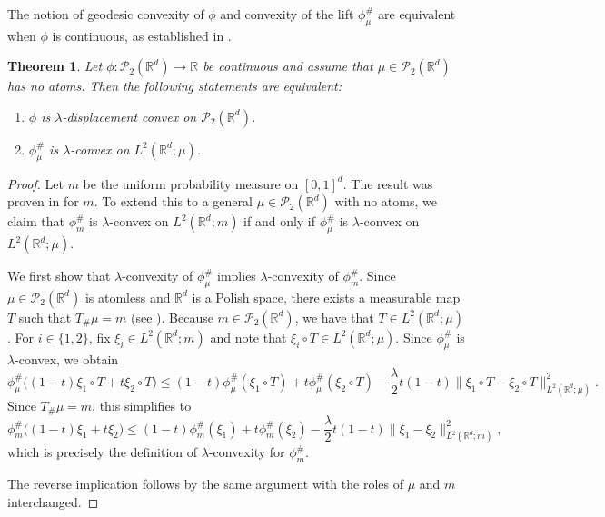 \documentclass[11pt,a4paper]{amsart}
\newcommand{\1}{\mathds{1}}
\newcommand{\R}{{\mathbb R}}
\newtheorem{theorem}{\textbf{Theorem}}[section]
\numberwithin{equation}{section}
\begin{document}
\smallskip

The notion of geodesic convexity of $\phi$ and convexity of the lift $\phi^{\#}_{\mu}$ are equivalent when $ \phi $ is continuous, as established in \cite{gangbo2022global}.

\begin{theorem} \label{convex_equivalence} \cite[Lemma 3.6]{gangbo2022global}
Let $ \phi : \mathcal{P}_2(\mathbb{R}^d) \to \mathbb{R} $ be \textnormal{continuous} and assume that $\mu \in \mathcal{P}_2(\R^d)$ has no atoms. Then the following statements are equivalent:
\begin{center}
\begin{enumerate}
    \item $\phi$ is $\lambda$-displacement convex on $\mathcal{P}_2(\mathbb{R}^d)$.
    \item $\phi_{\mu}^{\#}$ is $\lambda$-convex on $L^2(\mathbb{R}^d; \mu)$.
\end{enumerate}
\end{center}

\end{theorem}
\begin{proof}
Let $m$ be the uniform probability measure on $[0,1]^d$. The result was proven in \cite[Lemma 3.6]{gangbo2022global} for $m$. To extend this to a general $\mu \in \mathcal{P}_2(\mathbb{R}^d)$ with no atoms, we claim that $\phi^{\#}_m$ is $\lambda$-convex on $L^2(\mathbb{R}^d; m)$ if and only if $\phi^{\#}_\mu$ is $\lambda$-convex on $L^2(\mathbb{R}^d; \mu)$.
\smallskip

We first show that $\lambda$-convexity of $\phi^{\#}_\mu$ implies $\lambda$-convexity of $\phi^{\#}_m$. Since $\mu \in \mathcal{P}_2(\mathbb{R}^d)$ is atomless and $\mathbb{R}^d$ is a Polish space, there exists a measurable map $T$ such that $T_{\#} \mu = m$ (see \cite[Page 379]{carmona2018probabilistic}). Because $m \in \mathcal{P}_2(\R^d)$, we have that $T \in L^2(\mathbb{R}^d; \mu)$. For $i \in \{1,2\}$, fix $\xi_i \in L^2(\mathbb{R}^d; m)$ and note that $\xi_i \circ T \in L^2(\mathbb{R}^d; \mu)$. Since $\phi^{\#}_\mu$ is $\lambda$-convex, we obtain
\[
\phi^{\#}_\mu\big((1-t) \xi_1 \circ T + t \xi_2 \circ T\big) \leq (1-t) \phi^{\#}_\mu(\xi_1 \circ T) + t \phi^{\#}_\mu(\xi_2 \circ T) - \frac{\lambda}{2} t(1-t) \|\xi_1 \circ T - \xi_2 \circ T\|^2_{L^2(\mathbb{R}^d; \mu)}.
\]
Since $T_{\#} \mu = m$, this simplifies to
\[
\phi^{\#}_m\big((1-t) \xi_1 + t \xi_2\big) \leq (1-t) \phi^{\#}_m(\xi_1) + t \phi^{\#}_m(\xi_2) - \frac{\lambda}{2} t(1-t) \|\xi_1 - \xi_2\|^2_{L^2(\mathbb{R}^d; m)},
\]
which is precisely the definition of $\lambda$-convexity for $\phi^{\#}_m$.

\smallskip

The reverse implication follows by the same argument with the roles of $\mu$ and $m$ interchanged.
\end{proof}
\end{document}
